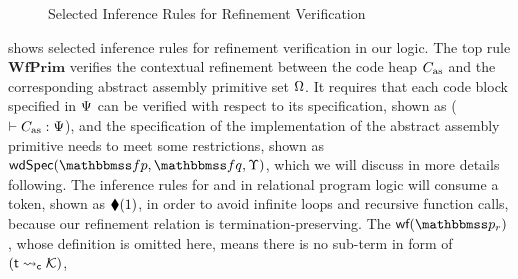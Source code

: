 \begin{figure*}[!t]
    \caption{Selected Inference Rules for Refinement Verification}
    \label{fig:Selected Inference Rules for Refinement Verification}
\end{figure*}
\Fig{\ref{fig:Selected Inference Rules for Refinement Verification}}
shows selected inference rules for refinement verification in our
logic. The top rule $\textbf{WfPrim}$ verifies the contextual refinement
between the code heap $C_{\text{as}}$ and the corresponding abstract assembly
primitive set $\Omega$. It requires that each code block specified
in $\Psi$ can be verified with respect to its specification,
shown as ($\vdash {C_{\text{as}}} : {\Psi}$), and the specification
of the implementation of the abstract assembly primitive needs
to meet some restrictions, shown as $\wdSpec{\relspecpre}{\relspecpost}{\hprim}$,
which we will discuss in more details following.
The inference rules for \jmp{} and \call{} in
relational program logic will consume a token,
shown as $\blacklozenge({1})$, in order to avoid
infinite loops and recursive function calls,
because our refinement relation is
termination-preserving.
The $\wfFrm(\relastP_r)$, whose definition is omitted here,
means there is no sub-term in
form of $({\textsf{t}} \leadsto_{\textsf{c}} {\mathcal{K}})$,
